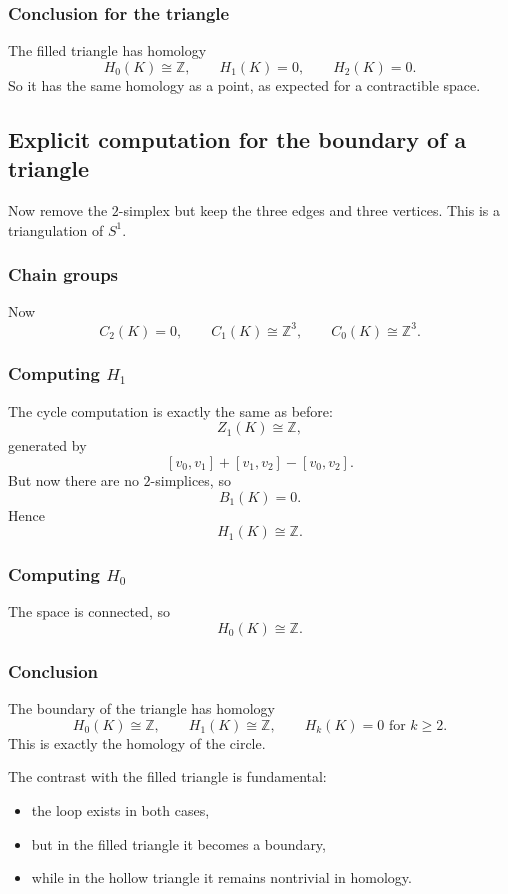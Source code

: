\documentclass[12pt,a4paper]{article}
\theoremstyle{notespace}
\begin{document}
\subsubsection{Conclusion for the triangle}

The filled triangle has homology
\[
H_0(K)\cong \mathbb{Z},
\qquad
H_1(K)=0,
\qquad
H_2(K)=0.
\]
So it has the same homology as a point, as expected for a contractible space.

\subsection{Explicit computation for the boundary of a triangle}

Now remove the \(2\)-simplex but keep the three edges and three vertices. This is a triangulation of \(S^1\).

\subsubsection{Chain groups}

Now
\[
C_2(K)=0,
\qquad
C_1(K)\cong \mathbb{Z}^3,
\qquad
C_0(K)\cong \mathbb{Z}^3.
\]

\subsubsection{Computing \texorpdfstring{$H_1$}{H1}}

The cycle computation is exactly the same as before:
\[
Z_1(K)\cong \mathbb{Z},
\]
generated by
\[
[v_0,v_1]+[v_1,v_2]-[v_0,v_2].
\]
But now there are no \(2\)-simplices, so
\[
B_1(K)=0.
\]
Hence
\[
H_1(K)\cong \mathbb{Z}.
\]

\subsubsection{Computing \texorpdfstring{$H_0$}{H0}}

The space is connected, so
\[
H_0(K)\cong \mathbb{Z}.
\]

\subsubsection{Conclusion}

The boundary of the triangle has homology
\[
H_0(K)\cong \mathbb{Z},
\qquad
H_1(K)\cong \mathbb{Z},
\qquad
H_k(K)=0 \text{ for } k\ge 2.
\]
This is exactly the homology of the circle.

The contrast with the filled triangle is fundamental:
\begin{itemize}
	\item the loop exists in both cases,
	\item but in the filled triangle it becomes a boundary,
	\item while in the hollow triangle it remains nontrivial in homology.
\end{itemize}
\end{document}
